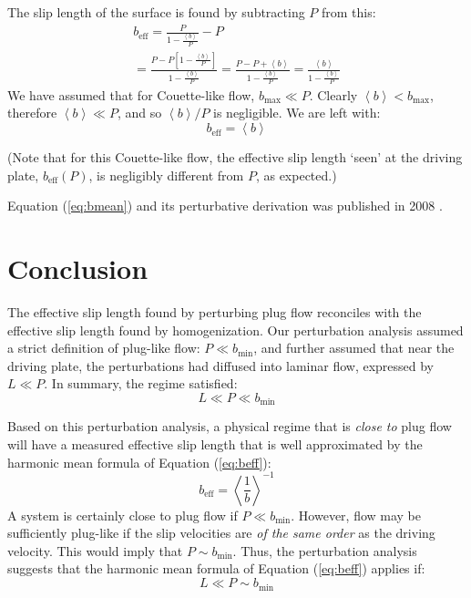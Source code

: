 \documentclass[12pt, a4paper, twoside, openright]{book}
\newcommand{\beff}{\ensuremath{b_{\mathrm{eff}}}}
\newcommand{\bmin}{\ensuremath{b_{\mathrm{min}}}}
\newcommand{\bmax}{\ensuremath{b_{\mathrm{max}}}}
\begin{document}
The slip length of the surface is found by subtracting $P$ from this:
\begin{gather}
\beff = \frac{P}{1 - \frac{\left< b \right>}{P}} - P \\
= \frac{P - P \left[ 1 - \frac{\left< b \right>}{P} \right]}{1 - \frac{\left< b \right>}{P}}
= \frac{ P - P + \left< b \right> }{1 - \frac{\left< b \right>}{P}} 
= \frac{\left< b \right> }{1 - \frac{\left< b \right>}{P}}
\end{gather}
We have assumed that for Couette-like flow, $\bmax \ll P$.  Clearly $\left< b \right> < \bmax $, therefore $ \left< b \right> \ll P$, and so $\left< b \right> / P$ is negligible.  We are left with:
\begin{equation}
\beff = \left< b \right>
\label{eq:bmean}
\end{equation}

(Note that for this Couette-like flow, the effective slip length `seen' at the driving plate, $\beff(P)$, is negligibly different from $P$, as expected.)

Equation (\ref{eq:bmean}) and its perturbative derivation was published in 2008 \cite{LundHendy2008}.

\clearpage
\section{Conclusion}

The effective slip length found by perturbing plug flow reconciles with the effective slip length found by homogenization.
Our perturbation analysis assumed a strict definition of plug-like flow: $P \ll \bmin$, and further assumed that near the driving plate, the perturbations had diffused into laminar flow, expressed by $L \ll P$.  In summary, the regime satisfied:
\begin{equation}
L \ll P \ll \bmin
\end{equation}

Based on this perturbation analysis, a physical regime that is \emph{close to} plug flow will have a measured effective slip length that is well approximated by the harmonic mean formula of Equation (\ref{eq:beff}): 
\begin{equation}
\beff = \left< \frac{1}{b} \right>^{-1}
\end{equation}
A system is certainly close to plug flow if $P \ll \bmin$.  However, flow may be sufficiently plug-like if the slip velocities are \emph{of the same order} as the driving velocity.  This would imply that $P \sim \bmin$.  Thus, the perturbation analysis suggests that the harmonic mean formula of Equation (\ref{eq:beff}) applies if:
\begin{equation}
L \ll P \sim \bmin
\end{equation}
\end{document}
